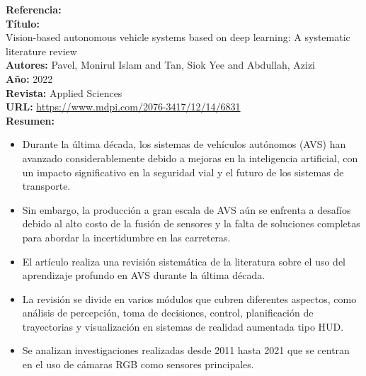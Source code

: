 \documentclass[10pt,letterpaper,final]{article}
\begin{document}
\begin{longtable}
        \hline
        \noindent \textbf{Referencia:}~\cite{pavel2022vision}                                          \\
        \textbf{Título:}                                                                               \\
        Vision-based autonomous vehicle systems based on deep learning: A systematic literature review \\
        \textbf{Autores:}
        Pavel, Monirul Islam and Tan, Siok Yee and Abdullah, Azizi                                     \\
        \textbf{Año:}
        2022                                                                                           \\
        \textbf{Revista:}
        Applied Sciences                                                                               \\
        \textbf{URL:}
        \url{https://www.mdpi.com/2076-3417/12/14/6831}                                                \\
        \textbf{Resumen:}                                                                              \\
        \begin{itemize}
            \item Durante la última década, los sistemas de vehículos autónomos (AVS) han avanzado considerablemente debido a mejoras
            en la inteligencia artificial, con un impacto significativo en la seguridad vial y el futuro de los sistemas de transporte.
            \item Sin embargo, la producción a gran escala de AVS aún se enfrenta a desafíos debido al alto costo de la fusión
            de sensores y la falta de soluciones completas para abordar la incertidumbre en las carreteras.
            \item El artículo realiza una revisión sistemática de la literatura sobre el uso del aprendizaje profundo en AVS
            durante la última década.
            \item La revisión se divide en varios módulos que cubren diferentes aspectos, como análisis de percepción, toma de decisiones,
            control, planificación de trayectorias y visualización en sistemas de realidad aumentada tipo HUD.
            \item Se analizan investigaciones realizadas desde 2011 hasta 2021 que se centran en el uso de cámaras RGB como sensores principales.

\end{itemize}
\end{longtable}
\end{document}
